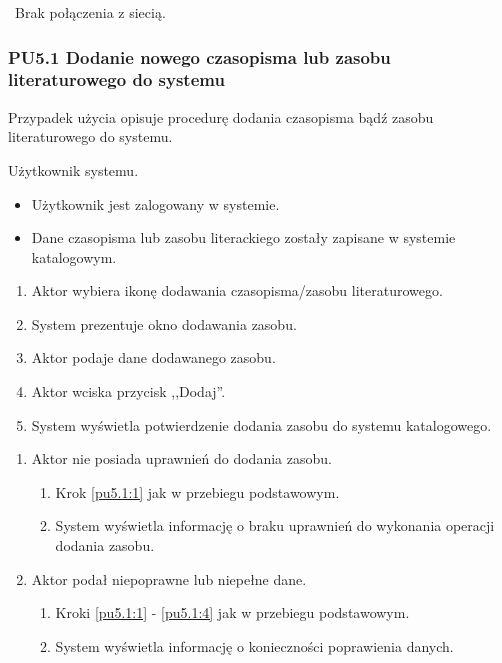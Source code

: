 \
Brak połączenia z siecią.

\subsubsection{PU5.1 Dodanie nowego czasopisma lub zasobu literaturowego do systemu}

Przypadek użycia opisuje procedurę dodania czasopisma bądź zasobu literaturowego do systemu.

Użytkownik systemu.

\begin{itemize}
\item Użytkownik jest zalogowany w systemie.
\end{itemize}

\begin{itemize}
\item Dane czasopisma lub zasobu literackiego zostały zapisane w systemie katalogowym.
\end{itemize}

\begin{enumerate}
\item \label{pu5.1:1} Aktor wybiera ikonę dodawania czasopisma/zasobu literaturowego.
\item System prezentuje okno dodawania zasobu.
\item Aktor podaje dane dodawanego zasobu.
\item \label{pu5.1:4} Aktor wciska przycisk ,,Dodaj''.
\item System wyświetla potwierdzenie dodania zasobu do systemu katalogowego.
\end{enumerate}

\begin{enumerate}
\item Aktor nie posiada uprawnień do dodania zasobu.
	\begin{enumerate}[label*=\arabic*.]
		\item Krok \ref{pu5.1:1} jak w przebiegu podstawowym.
		\item System wyświetla informację o braku uprawnień do wykonania operacji dodania zasobu.
	\end{enumerate}
\item Aktor podał niepoprawne lub niepełne dane.
	\begin{enumerate}[label*=\arabic*.]
		\item Kroki \ref{pu5.1:1} - \ref{pu5.1:4} jak w przebiegu podstawowym.
		\item System wyświetla informację o konieczności poprawienia danych.
	\end{enumerate}
\end{enumerate}

